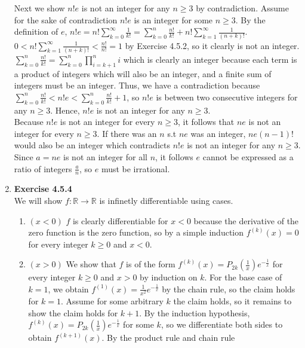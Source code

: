 \documentclass[10pt]{article}
\begin{document}
\begin{enumerate}[label=Problem \arabic*.]
    Next we show $n!e$ is not an integer for any $n\ge3$ by contradiction.
    Assume for the sake of contradiction $n!e$ is an integer for some $n\ge3$. By the definition of $e$, $\displaystyle n!e=n! \sum_{k=0}^{\infty}\frac{1}{k!}=\sum_{k=0}^{n}\frac{n!}{k!}+n!\sum_{k=1}^{\infty}\frac{1}{(n+k)!}$.\\
    $\displaystyle 0<n!\sum_{k=1}^{\infty}\frac{1}{(n+k)!}<\frac{n!}{n!}=1$ by Exercise 4.5.2, so it clearly is not an integer. $\displaystyle \sum_{k=0}^{n}\frac{n!}{k!}=\sum_{k=0}^{n}\prod_{i=k+1}^{n}i$ which is clearly an integer because each term is a product of integers which will also be an integer, and a finite sum of integers must be an integer. 
    Thus, we have a contradiction because $\displaystyle \sum_{k=0}^{n}\frac{n!}{k!}<n!e<\sum_{k=0}^{n}\frac{n!}{k!}+1$, so $n!e$ is between two consecutive integers for any $n\ge3$. Hence, $n!e$ is not an integer for any $n\ge3$.\\
    Because $n!e$ is not an integer for every $n\ge3$, it follows that $ne$ is not an integer for every $n\ge3$. If there was an $n$ s.t $ne$ was an integer, $ne(n-1)!$ would also be an integer which contradicts $n!e$ is not an integer for any $n\ge3$.
    Since $a=ne$ is not an integer for all $n$, it follows $e$ cannot be expressed as a ratio of integers $\frac{a}{n}$, so $e$ must be irrational.
    \item \textbf{Exercise 4.5.4}\\
    We will show $f:\mathbb{R}\rightarrow\mathbb{R}$ is infinetly differentiable using cases.\\
    \begin{enumerate}[label=Case \arabic*.]
        \item $(x<0)$ $f$ is clearly differentiable for $x<0$ because the derivative of the zero function is the zero function, so by a simple induction $f^{(k)}(x)=0$ for every integer $k\ge0$ and $x<0$.
        \item $(x>0)$ We show that $f$ is of the form $f^{(k)}(x)=P_{2k}(\frac{1}{x})e^{-\frac{1}{x}}$ for every integer $k\ge0$ and $x>0$ by induction on $k$.
        For the base case of $k=1$, we obtain $f^{(1)}(x)=\frac{1}{x^2}e^{-\frac{1}{x}}$ by the chain rule, so the claim holds for $k=1$. 
        Assume for some arbitrary $k$ the claim holds, so it remains to show the claim holds for $k+1$.
        By the induction hypothesis, $f^{(k)}(x)=P_{2k}(\frac{1}{x})e^{-\frac{1}{x}}$ for some $k$, so we differentiate both sides to obtain $f^{(k+1)}(x)$.
        By the product rule and chain rule 

\end{enumerate}
\end{enumerate}
\end{document}
